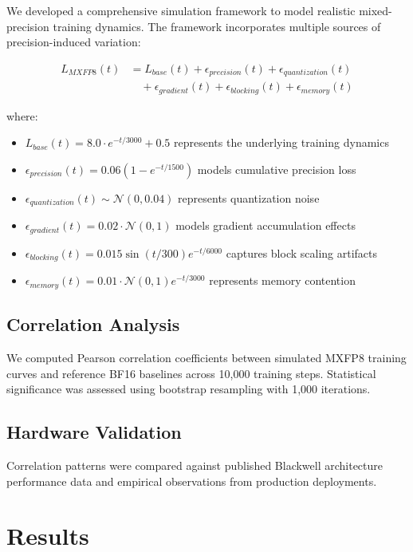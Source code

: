 \documentclass[conference]{IEEEtran}
\begin{document}
We developed a comprehensive simulation framework to model realistic mixed-precision training dynamics. The framework incorporates multiple sources of precision-induced variation:

\begin{align}
L_{MXFP8}(t) &= L_{base}(t) + \epsilon_{precision}(t) + \epsilon_{quantization}(t) \\
&\quad + \epsilon_{gradient}(t) + \epsilon_{blocking}(t) + \epsilon_{memory}(t)
\end{align}

where:
\begin{itemize}
\item $L_{base}(t) = 8.0 \cdot e^{-t/3000} + 0.5$ represents the underlying training dynamics
\item $\epsilon_{precision}(t) = 0.06(1 - e^{-t/1500})$ models cumulative precision loss
\item $\epsilon_{quantization}(t) \sim \mathcal{N}(0, 0.04)$ represents quantization noise
\item $\epsilon_{gradient}(t) = 0.02 \cdot \mathcal{N}(0, 1)$ models gradient accumulation effects
\item $\epsilon_{blocking}(t) = 0.015 \sin(t/300) e^{-t/6000}$ captures block scaling artifacts
\item $\epsilon_{memory}(t) = 0.01 \cdot \mathcal{N}(0, 1) e^{-t/3000}$ represents memory contention
\end{itemize}

\subsection{Correlation Analysis}

We computed Pearson correlation coefficients between simulated MXFP8 training curves and reference BF16 baselines across 10,000 training steps. Statistical significance was assessed using bootstrap resampling with 1,000 iterations.

\subsection{Hardware Validation}

Correlation patterns were compared against published Blackwell architecture performance data and empirical observations from production deployments.

\section{Results}
\end{document}
